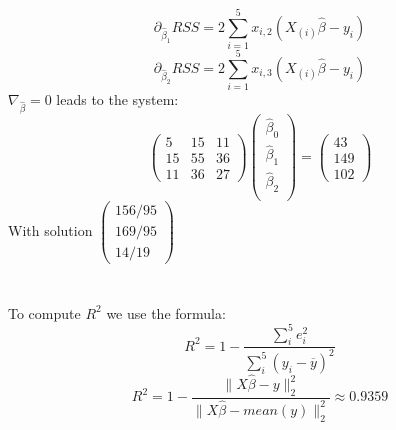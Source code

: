 \documentclass[12pt]{article}
\begin{document}
\begin{equation*}
    \partial_{\hat\beta_1}RSS = 2\sum_{i = 1}^{5}x_{i,2}(X_{(i)}\hat\beta - y_i)
\end{equation*}
\begin{equation*}
    \partial_{\hat\beta_2}RSS = 2\sum_{i = 1}^{5}x_{i,3}(X_{(i)}\hat\beta - y_i)
\end{equation*}
$\nabla_{\hat\beta} = 0$ leads to the system: \begin{equation*}
    \begin{pmatrix}
        5 & 15 & 11 \\ 15 & 55 & 36 \\ 11 & 36 & 27
    \end{pmatrix}\begin{pmatrix}
        \hat\beta_0 \\ \hat\beta_1 \\ \hat\beta_2 \\
    \end{pmatrix} = \begin{pmatrix}
        43 \\ 149 \\ 102
    \end{pmatrix}
\end{equation*}
With solution $\begin{pmatrix}
    156/95 \\ 169/95 \\ 14/19
\end{pmatrix}$ 
\section*{}
To compute $R^2$ we use the formula: \begin{equation*}
    R^2 = 1 - \frac{\sum_{i}^{5}e_i^2}{\sum_i^5 (y_i - \overline{y})^2}
\end{equation*}
\begin{equation*}
    R^2 = 1  - \frac{\|X\hat\beta - y\|_2^2}{\|X\hat\beta - mean(y)\|_2^2} \approx 0.9359
\end{equation*}
\end{document}
